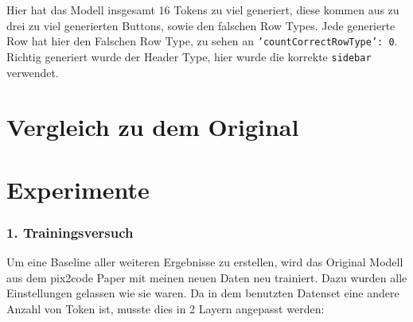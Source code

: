 \documentclass[pdftex,a4paper,halfparskip]{scrartcl}
\begin{document}
Hier hat das Modell insgesamt 16 Tokens zu viel generiert, diese kommen aus zu drei zu viel generierten Buttons, sowie den falschen Row Types. Jede generierte Row hat hier den Falschen Row Type, zu sehen an \texttt{'countCorrectRowType': 0}. Richtig generiert wurde der Header Type, hier wurde die korrekte \texttt{sidebar} verwendet.

\section{Vergleich zu dem Original}
\section{Experimente}

\subsubsection{1. Trainingsversuch}

Um eine Baseline aller weiteren Ergebnisse zu erstellen, wird das Original Modell aus dem pix2code Paper mit meinen neuen Daten neu trainiert. Dazu wurden alle Einstellungen gelassen wie sie waren. Da in dem benutzten Datenset eine andere Anzahl von Token ist, musste dies in 2 Layern angepasst werden:
\end{document}
